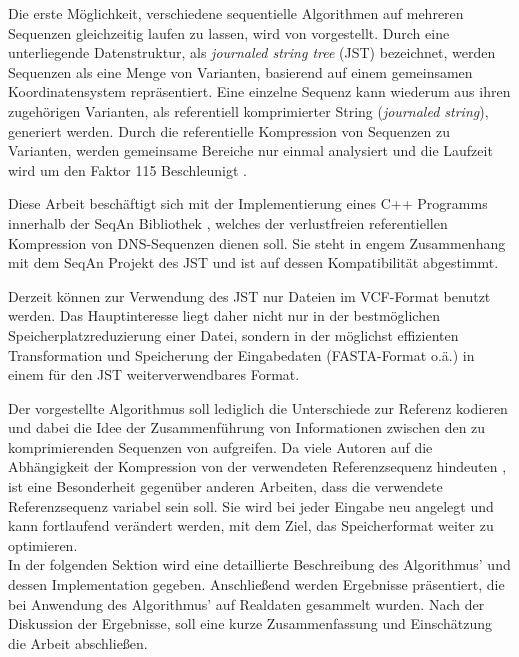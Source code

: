 \documentclass[12pt]{article}
\begin{document}
Die erste Möglichkeit, verschiedene sequentielle Algorithmen auf mehreren Sequenzen gleichzeitig laufen zu lassen, wird von \cite{Rahn15072014} vorgestellt. Durch eine unterliegende Datenstruktur, als \textit{journaled string tree} (JST) bezeichnet, werden Sequenzen als eine Menge von Varianten, basierend auf einem gemeinsamen Koordinatensystem repräsentiert. Eine einzelne Sequenz kann wiederum aus ihren zugehörigen Varianten, als referentiell komprimierter String (\textit{journaled string}), generiert werden. Durch die referentielle Kompression von Sequenzen zu Varianten, werden gemeinsame Bereiche nur einmal analysiert und die Laufzeit wird um den Faktor 115 Beschleunigt \cite{Rahn15072014}.

Diese Arbeit beschäftigt sich mit der Implementierung eines C++ Programms innerhalb der SeqAn Bibliothek \cite{doering08seqan}, welches der verlustfreien referentiellen Kompression von DNS-Sequenzen dienen soll. Sie steht in engem Zusammenhang mit dem SeqAn Projekt des JST \cite{Rahn15072014} und ist auf dessen Kompatibilität abgestimmt.

Derzeit können zur Verwendung des JST nur Dateien im VCF-Format benutzt werden. Das Hauptinteresse liegt daher nicht nur in der bestmöglichen Speicherplatzreduzierung einer Datei, sondern in der möglichst effizienten Transformation und Speicherung der Eingabedaten (FASTA-Format o.ä.) in einem für den JST weiterverwendbares Format. 

Der vorgestellte Algorithmus soll lediglich die Unterschiede zur Referenz kodieren und dabei die Idee der Zusammenführung von Informationen zwischen den zu komprimierenden Sequenzen von \cite{deoriwicz:GDC,deoriwicz:GDC2} aufgreifen. Da viele Autoren auf die Abhängigkeit der Kompression von der verwendeten Referenzsequenz hindeuten \cite{deorowicz13info,wandelt14trends,kuruppu:refseq}, ist eine Besonderheit gegenüber anderen Arbeiten, dass die verwendete Referenzsequenz variabel sein soll. Sie wird bei jeder Eingabe neu angelegt und kann fortlaufend verändert werden, mit dem Ziel, das Speicherformat weiter zu optimieren.\\

In der folgenden Sektion wird eine detaillierte Beschreibung des Algorithmus' und dessen Implementation gegeben. Anschließend werden Ergebnisse präsentiert, die bei Anwendung des Algorithmus' auf Realdaten gesammelt wurden. Nach der Diskussion der Ergebnisse, soll eine kurze Zusammenfassung und Einschätzung die Arbeit abschließen.

\end{document}
